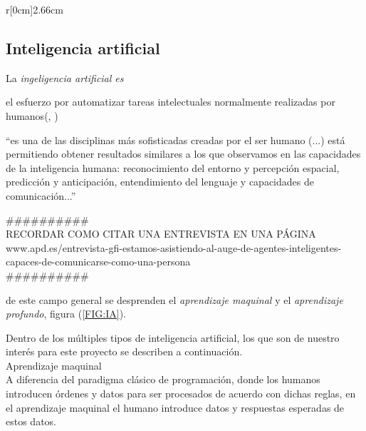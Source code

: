 \begin{wrapfigure}[9]{r}[0cm]{2.66cm}
	\caption[Inteligencia artificial]{\\Inteligencia\\artificial}\label{FIG:IA}
\end{wrapfigure}\subsection {Inteligencia artificial}\label{subsec:intela}
La \emph{ingeligencia artificial es}
\begin{displayquote}
el esfuerzo por automatizar tareas intelectuales normalmente realizadas por humanos(\citeauthor{cho18}, \citeyear{cho18})
\end{displayquote}
\begin{displayquote}
``es una de las disciplinas más sofisticadas creadas por el ser humano (...) está permitiendo obtener resultados similares a los que observamos en las capacidades de la inteligencia humana: reconocimiento del entorno y percepción espacial, predicción y anticipación, entendimiento del lenguaje y capacidades de comunicación...''\end{displayquote}
\#\#\#\#\#\#\#\#\#\#\\
RECORDAR COMO CITAR UNA ENTREVISTA EN UNA PÁGINA\\
www.apd.es/entrevista-gfi-estamos-asistiendo-al-auge-de-agentes-inteligentes-capaces-de-comunicarse-como-una-persona\\
\#\#\#\#\#\#\#\#\#\#

de este campo general se desprenden el \emph{aprendizaje maquinal} y el \emph{aprendizaje profundo}, figura (\ref{FIG:IA}).

Dentro de los múltiples tipos de inteligencia artificial, los que son de nuestro interés para este proyecto se describen a continuación.\\

Aprendizaje maquinal\\
A diferencia del paradigma clásico de programación, donde los humanos introducen órdenes y datos para ser procesados de acuerdo con dichas reglas, en el aprendizaje maquinal el humano introduce datos y respuestas esperadas de estos datos.


